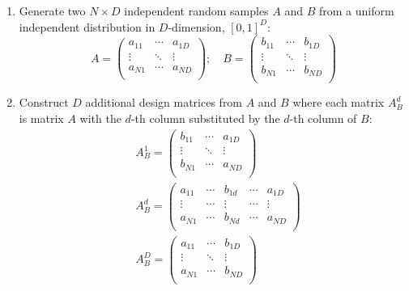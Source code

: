 \begin{enumerate}

  \item Generate two $N \times D$ independent random samples $A$ and $B$ from a uniform independent distribution in $D$-dimension, $[0,1]^D$:
    \begin{equation}
      A = 
      \begin{pmatrix}
        a_{11}  & \cdots  & a_{1D}\\
        \vdots	& \ddots & \vdots\\
        a_{N1}  & \cdots  & a_{ND}\\
      \end{pmatrix}
      ;\quad B = 
      \begin{pmatrix}
        b_{11}  & \cdots  & b_{1D}\\
        \vdots	& \ddots & \vdots\\
        b_{N1}  & \cdots  & b_{ND}\\
        \end{pmatrix}
    \label{eq:ss_two_samples}
    \end{equation}

  \item Construct $D$ additional design matrices from $A$ and $B$ where each matrix $A^d_B$ is matrix $A$ with the $d$-th column substituted by the $d$-th column of $B$:
  \begin{equation}
    \begin{split}
      & A_{B}^1 = 
      \begin{pmatrix}
        b_{11}  & \cdots  & a_{1D}\\
        \vdots	& \ddots & \vdots\\
        b_{N1}  & \cdots  & a_{ND}\\
      \end{pmatrix} \\
      & A_{B}^{d} = 
      \begin{pmatrix}
        a_{11}  & \cdots & b_{1d} & \cdots & a_{1D}\\
        \vdots	& \cdots & \vdots & \cdots & \vdots\\
        a_{N1}  & \cdots & b_{Nd} & \cdots & a_{ND}\\
      \end{pmatrix} \\
      & A_{B}^{D} = 
      \begin{pmatrix}
        a_{11}  & \cdots  & b_{1D}\\
        \vdots	& \ddots & \vdots\\
        a_{N1}  & \cdots  & b_{ND}\\
      \end{pmatrix}
    \end{split}
  \label{eq:ss_sampling_resampling}
  \end{equation}


\end{enumerate}
